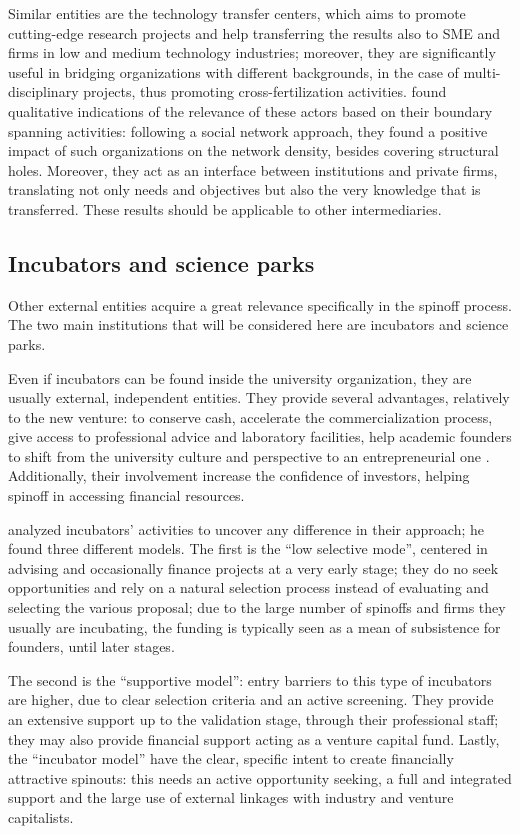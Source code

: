 Similar entities are the technology transfer centers, which aims to promote cutting-edge research projects and help transferring the results also to SME and firms in low and medium technology industries; moreover, they are significantly useful in bridging organizations with different backgrounds, in the case of multi-disciplinary projects, thus promoting cross-fertilization activities. \citet{Comacchio2012} found qualitative indications of the relevance of these actors based on their boundary spanning activities: following a social network approach, they found a positive impact of such organizations on the network density, besides covering structural holes. Moreover, they act as an interface between institutions and private firms, translating not only needs and objectives but also the very knowledge that is transferred. These results should be applicable to other intermediaries.

\subsection{Incubators and science parks}
Other external entities acquire a great relevance specifically in the spinoff process. The two main institutions that will be considered here are incubators and science parks. 

Even if incubators can be found inside the university organization, they are usually external, independent entities. They provide several advantages, relatively to the new venture: to conserve cash, accelerate the commercialization process, give access to professional advice and laboratory facilities, help academic founders to shift from the university culture and perspective to an entrepreneurial one \citep{Ittelson2002}. Additionally, their involvement increase the confidence of investors, helping spinoff in accessing financial resources.

\citet{Clarysse2005} analyzed incubators' activities to uncover any difference in their approach; he found three different models. The first is the \enquote{low selective mode}, centered in advising and occasionally finance projects at a very early stage; they do no seek opportunities and rely on a natural selection process instead of evaluating and selecting the various proposal; due to the large number of spinoffs and firms they usually are incubating, the funding is typically seen as a mean of subsistence for founders, until later stages. 

The second is the \enquote{supportive model}: entry barriers to this type of incubators are higher, due to clear selection criteria and an active screening. They provide an extensive support up to the validation stage, through their professional staff; they may also provide financial support acting as a venture capital fund. Lastly, the \enquote{incubator model} have the clear, specific intent to create financially attractive spinouts: this needs an active opportunity seeking, a full and integrated support and the large use of external linkages with industry and venture capitalists.

